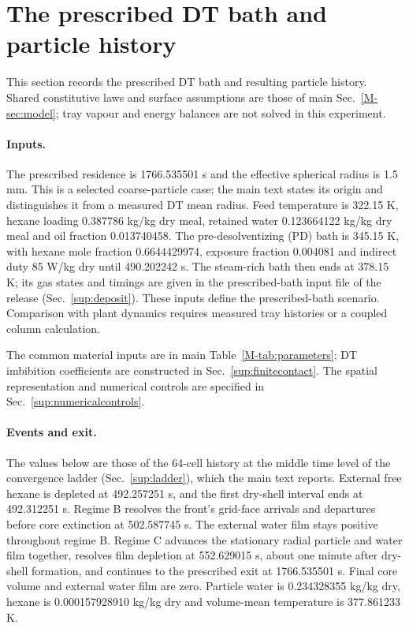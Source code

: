 \section{The prescribed DT bath and particle history}
\label{sup:dtmarch}
This section records the prescribed DT bath and resulting particle
history. Shared constitutive laws and surface assumptions are those of
main Sec.~\ref*{M-sec:model}; tray vapour and energy balances are not
solved in this experiment.

\paragraph{Inputs.}
The prescribed residence is 1766.535501 s and the effective spherical
radius is 1.5 mm. This is a selected coarse-particle case; the main text
states its origin and distinguishes it from a measured DT mean radius.
Feed temperature is 322.15 K, hexane loading 0.387786 kg/kg dry meal,
retained water 0.123664122 kg/kg dry meal and oil fraction 0.013740458.
The pre-desolventizing (PD) bath is 345.15 K, with hexane mole fraction
0.6644429974, exposure fraction 0.004081 and indirect duty 85 W/kg dry
until 490.202242 s. The steam-rich bath then ends at 378.15 K;
its gas states and timings are given in the prescribed-bath input file
of the release (Sec.~\ref{sup:deposit}). These inputs define the prescribed-bath scenario. Comparison with
plant dynamics requires measured tray histories or a coupled column calculation.

The common material inputs are in main Table~\ref*{M-tab:parameters};
DT imbibition coefficients are constructed in Sec.~\ref{sup:finitecontact}.
The spatial representation and numerical controls are specified
in Sec.~\ref{sup:numericalcontrols}.

\paragraph{Events and exit.}
The values below are those of the 64-cell history at the middle time
level of the convergence ladder (Sec.~\ref{sup:ladder}), which the main
text reports. External free hexane is depleted at 492.257251 s, and the
first dry-shell interval ends at 492.312251 s. Regime B resolves the
front's grid-face arrivals and departures before core extinction at
502.587745 s. The external water film stays positive throughout regime B.
Regime C advances the stationary radial particle and water film together,
resolves film depletion at 552.629015 s, about one minute after dry-shell
formation, and continues to the prescribed exit at 1766.535501 s. Final
core volume and external water film are zero. Particle water is
0.234328355 kg/kg dry, hexane is 0.000157928910 kg/kg dry and volume-mean
temperature is 377.861233 K.

